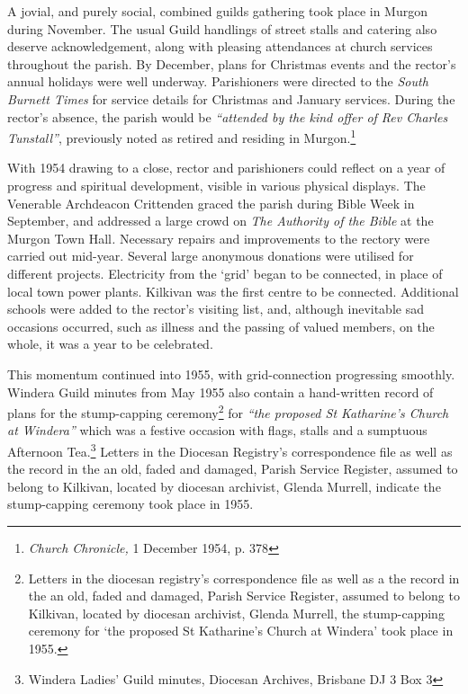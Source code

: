 A jovial, and purely social, combined guilds gathering took place in Murgon during November. The usual Guild handlings of street stalls and catering also deserve acknowledgement, along with pleasing attendances at church services throughout the parish. By December, plans for Christmas events and the rector's annual holidays were well underway. Parishioners were directed to the \emph{South Burnett Times} for service details for Christmas and January services. During the rector's absence, the parish would be \emph{``attended by the kind offer of Rev Charles Tunstall''}, previously noted as retired and residing in Murgon.\footnote{\emph{Church Chronicle,} 1 December 1954, p. 378}


With 1954 drawing to a close, rector and parishioners could reflect on a year of progress and spiritual development, visible in various physical displays. The Venerable Archdeacon Crittenden graced the parish during Bible Week in September, and addressed a large crowd on \emph{The Authority of the Bible} at the Murgon Town Hall\emph{.} Necessary repairs and improvements to the rectory were carried out mid-year. Several large anonymous donations were utilised for different projects. Electricity from the `grid' began to be connected, in place of local town power plants. Kilkivan was the first centre to be connected. Additional schools were added to the rector's visiting list, and, although inevitable sad occasions occurred, such as illness and the passing of valued members, on the whole, it was a year to be celebrated.



This momentum continued into 1955, with grid-connection progressing smoothly. Windera Guild minutes from May 1955 also contain a hand-written record of plans for the stump-capping ceremony\footnote{Letters in the diocesan registry's correspondence file as well as a the record in the an old, faded and damaged, Parish Service Register, assumed to belong to Kilkivan, located by diocesan archivist, Glenda Murrell, the stump-capping ceremony for `the proposed St Katharine's Church at Windera' took place in 1955.} for \emph{``the proposed St Katharine's Church at Windera''} which was a festive occasion with flags, stalls and a sumptuous Afternoon Tea.\footnote{Windera Ladies' Guild minutes, Diocesan Archives, Brisbane DJ 3 Box 3} Letters in the Diocesan Registry's correspondence file as well as the record in the an old, faded and damaged, Parish Service Register, assumed to belong to Kilkivan, located by diocesan archivist, Glenda Murrell, indicate the stump-capping ceremony took place in 1955.








